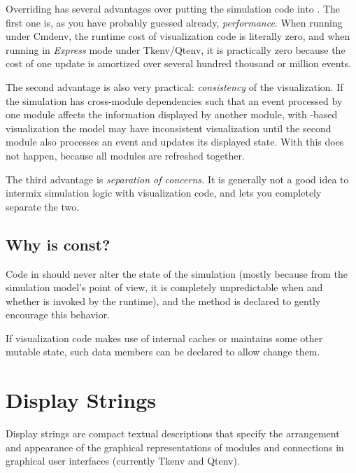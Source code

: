 Overriding  has several advantages over putting the
simulation code into . The first one is, as you have
probably guessed already, \textit{performance}. When running under Cmdenv,
the runtime cost of visualization code is literally zero, and when running
in \textit{Express} mode under Tkenv/Qtenv, it is practically zero because
the cost of one update is amortized over several hundred thousand or
million events.

The second advantage is also very practical: \textit{consistency} of the
visualization. If the simulation has cross-module dependencies such that
an event processed by one module affects the information displayed
by another module, with -based visualization
the model may have inconsistent visualization until the second module
also processes an event and updates its displayed state. With
 this does not happen, because all modules
are refreshed together.

The third advantage is \textit{separation of concerns.} It is generally
not a good idea to intermix simulation logic with visualization code,
and  lets you completely separate the two.


\subsection{Why is  const?}
\label{sec:graphics:refreshdisplay-constness}

Code in  should never alter the state of the
simulation (mostly because from the simulation model's point of
view, it is completely unpredictable when and whether 
is invoked by the runtime), and the method is declared  to gently
encourage this behavior.

If visualization code makes use of internal caches or maintains some
other mutable state, such data members can be declared 
to allow  change them.


\section{Display Strings}
\label{sec:graphics:display-strings}

Display strings are compact textual descriptions
that specify the arrangement and appearance of the graphical
representations of modules and connections in graphical user interfaces
(currently Tkenv and Qtenv).

